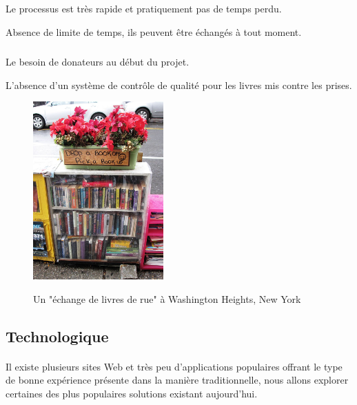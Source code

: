 \subparagraph*{}
\begin{list}{•}{\textbf{Avantages}}
	\item Le processus est très rapide et pratiquement pas de temps perdu.
	\item Absence de limite de temps, ils peuvent être échangés à tout moment.
\end{list}

\subparagraph*{}
\begin{list}{•}{\textbf{Inconvénients}}
	\item Le besoin de donateurs au début du projet.
	\item L'absence d'un système de contrôle de qualité pour les livres mis contre les prises.
\end{list}

\begin{figure}[h]
	\begin{center}
		\includegraphics[width=5cm]{Images/chapter1/bookswapSpot.jpg}
		\caption{Un "échange de livres de rue" à Washington Heights, New York}\cite{noauthor_book_2019}
	\end{center}
\end{figure}

\newpage

\subsection{Technologique}

\paragraph*{}
Il existe plusieurs sites Web et très peu d'applications populaires offrant le type de bonne expérience présente dans la manière traditionnelle, nous allons explorer certaines des plus populaires solutions existant aujourd’hui.\\

